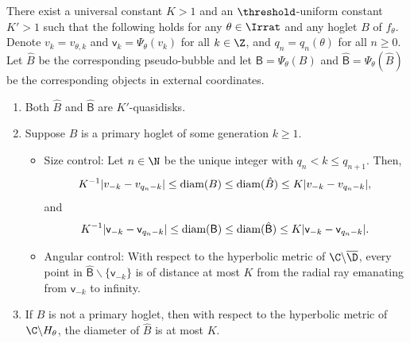 \documentclass{amsart}
\begin{document}
\begin{theorem}
\label{thm:bubble-bounds}
    There exist a universal constant $K> 1$ and an $\threshold$-uniform constant $K' > 1$ such that the following holds for any $\theta \in \Irrat$ and any hoglet $B$ of $f_{\theta}$.
    Denote $v_k = v_{\theta,k}$ and $\mathsf{v}_k = \Psi_{\theta}(v_k)$ for all $k \in \Z$, and $q_n = q_n(\theta)$ for all $n \geq 0$.
    Let $\hat{B}$ be the corresponding pseudo-bubble and let $\mathsf{B} = \Psi_\theta(B)$ and $\hat{\mathsf{B}} = \Psi_\theta(\hat{B})$ be the corresponding objects in external coordinates.
\begin{enumerate}
        \item Both $\hat{B}$ and $\hat{\mathsf{B}}$ are $K'$-quasidisks.
        \item Suppose $B$ is a primary hoglet of some generation $k \geq 1$.
        \begin{itemize}
            \item Size control: Let $n \in \N$ be the unique integer with $q_n < k \leq  q_{n+1}$. Then,
            \[
                K^{-1} |v_{-k} - v_{q_n-k}| \leq \textnormal{diam}(B) \leq \textnormal{diam}(\hat{B}) \leq K |v_{-k} - v_{q_n-k}|,
            \]
            and
            \[
                K^{-1} |\mathsf{v}_{-k} - \mathsf{v}_{q_n-k}| \leq \textnormal{diam}(\mathsf{B}) \leq \textnormal{diam}(\hat{\mathsf{B}}) \leq K |\mathsf{v}_{-k} - \mathsf{v}_{q_n-k}|.
            \]
            \item Angular control: With respect to the hyperbolic metric of $\C \backslash \overline{\D}$, every point in $\hat{\mathsf{B}} \backslash \{\mathsf{v}_{-k}\}$ is of distance at most $K$ from the radial ray emanating from $\mathsf{v}_{-k}$ to infinity.
        \end{itemize}
        \item If $B$ is not a primary hoglet, then with respect to the hyperbolic metric of $\C \backslash H_\theta$, the diameter of $\hat{B}$ is at most $K$.
    \end{enumerate}
    \end{theorem}
\end{document}
